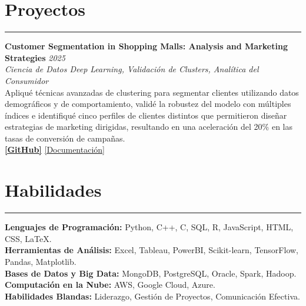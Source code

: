 \documentclass[9pt,a4paper]{article}
\begin{document}
\section*{Proyectos}
\vspace{-\baselineskip}

\vspace{-\baselineskip}
\noindent\rule{\linewidth}{0.5pt}
\textbf{Customer Segmentation in Shopping Malls: Analysis and Marketing Strategies} \hfill \textit{2025} \\
\textit{Ciencia de Datos \textbar{} Deep Learning, Validación de Clusters, Analítica del Consumidor} \\
Apliqué técnicas avanzadas de clustering para segmentar clientes utilizando datos demográficos y de comportamiento, validé la robustez del modelo con múltiples índices e identifiqué cinco perfiles de clientes distintos que permitieron diseñar estrategias de marketing dirigidas, resultando en una aceleración del 20\% en las tasas de conversión de campañas. \\
\textbf{\href{https://github.com/Ares-Infenus/Customer-Segmentation-in-Shopping-Malls}{[GitHub]}} \textbar{} \href{https://www.linkedin.com/in/sebastiandpinzon/details/projects/1241739216/multiple-media-viewer/?profileId=ACoAAE1Rr-wBOmNQPb8b_Cv0upjAksei7ukFViM&treasuryMediaId=1742855945746}{[Documentación]}
\vspace{-\baselineskip}
\vspace{-\baselineskip}

\section*{Habilidades}
\vspace{-\baselineskip}
\vspace{-\baselineskip}

\noindent\rule{\linewidth}{0.5pt}

\textbf{Lenguajes de Programación:} Python, C++, C, SQL, R, JavaScript, HTML, CSS, LaTeX.\\
\textbf{Herramientas de Análisis:} Excel, Tableau, PowerBI, Scikit-learn, TensorFlow, Pandas, Matplotlib.\\
\textbf{Bases de Datos y Big Data:} MongoDB, PostgreSQL, Oracle, Spark, Hadoop.\\
\textbf{Computación en la Nube:} AWS, Google Cloud, Azure.\\
\textbf{Habilidades Blandas:} Liderazgo, Gestión de Proyectos, Comunicación Efectiva.
\vspace{-\baselineskip}
\vspace{-\baselineskip}
\end{document}
